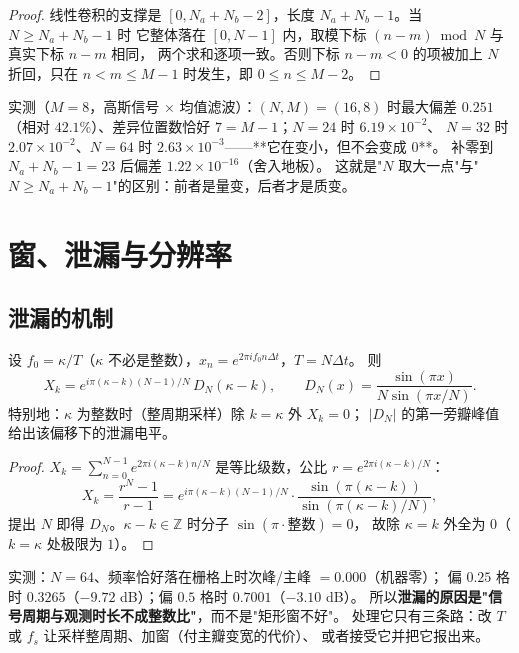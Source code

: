 \begin{proof}
线性卷积的支撑是 $[0,N_a+N_b-2]$，长度 $N_a+N_b-1$。当 $N\ge N_a+N_b-1$ 时
它整体落在 $[0,N-1]$ 内，取模下标 $(n-m)\bmod N$ 与真实下标 $n-m$ 相同，
两个求和逐项一致。否则下标 $n-m<0$ 的项被加上 $N$ 折回，只在
$n<m\le M-1$ 时发生，即 $0\le n\le M-2$。
\end{proof}

实测（$M=8$，高斯信号 $\times$ 均值滤波）：$(N,M)=(16,8)$ 时最大偏差 $0.251$
（相对 $42.1\%$）、差异位置数恰好 $7=M-1$；$N=24$ 时 $6.19\times10^{-2}$、
$N=32$ 时 $2.07\times10^{-2}$、$N=64$ 时 $2.63\times10^{-3}$——**它在变小，但不会变成 $0$**。
补零到 $N_a+N_b-1=23$ 后偏差 $1.22\times10^{-16}$（舍入地板）。
这就是"$N$ 取大一点"与"$N\ge N_a+N_b-1$"的区别：前者是量变，后者才是质变。

\section{窗、泄漏与分辨率}

\subsection{泄漏的机制}

\begin{theorem}
\label{thm:leakage}
设 $f_0=\kappa/T$（$\kappa$ 不必是整数），$x_n=e^{2\pi i f_0n\Delta t}$，$T=N\Delta t$。
则
\[
X_k=e^{i\pi(\kappa-k)(N-1)/N}\,D_N(\kappa-k),\qquad D_N(x)=\frac{\sin(\pi x)}{N\sin(\pi x/N)} .
\]
特别地：$\kappa$ 为整数时（整周期采样）除 $k=\kappa$ 外 $X_k=0$；
$|D_N|$ 的第一旁瓣峰值给出该偏移下的泄漏电平。
\end{theorem}

\begin{proof}
$X_k=\sum_{n=0}^{N-1}e^{2\pi i(\kappa-k)n/N}$ 是等比级数，公比
$r=e^{2\pi i(\kappa-k)/N}$：
\[
X_k=\frac{r^N-1}{r-1}
=e^{i\pi(\kappa-k)(N-1)/N}\cdot\frac{\sin(\pi(\kappa-k))}{\sin(\pi(\kappa-k)/N)},
\]
提出 $N$ 即得 $D_N$。$\kappa-k\in\mathbb Z$ 时分子 $\sin(\pi\cdot\text{整数})=0$，
故除 $\kappa=k$ 外全为 $0$（$k=\kappa$ 处极限为 $1$）。
\end{proof}

实测：$N=64$、频率恰好落在栅格上时次峰/主峰 $=0.000$（机器零）；
偏 $0.25$ 格时 $0.3265$（$-9.72$ dB）；偏 $0.5$ 格时 $0.7001$（$-3.10$ dB）。
所以\textbf{泄漏的原因是"信号周期与观测时长不成整数比"}，而不是"矩形窗不好"。
处理它只有三条路：改 $T$ 或 $f_s$ 让采样整周期、加窗（付主瓣变宽的代价）、
或者接受它并把它报出来。

